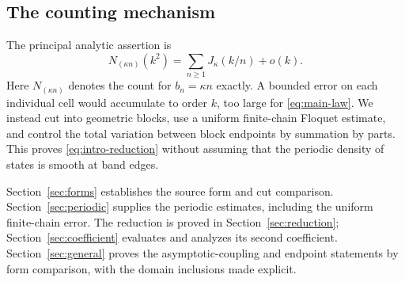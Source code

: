 \subsection{The counting mechanism}

The principal analytic assertion is
\begin{equation}
 N_{(\kappa n)}(k^2)=\sum_{n\ge1}J_\kappa(k/n)+o(k).
 \label{eq:intro-reduction}
\end{equation}
Here $N_{(\kappa n)}$ denotes the count for $b_n=\kappa n$ exactly.
A bounded error on each individual cell would accumulate to order
$k$, too large for \eqref{eq:main-law}. We instead cut into geometric
blocks, use a uniform finite-chain Floquet estimate, and control
the total variation between block endpoints by summation by parts.
This proves \eqref{eq:intro-reduction} without assuming that the
periodic density of states is smooth at band edges.

Section~\ref{sec:forms} establishes the source form and cut comparison.
Section~\ref{sec:periodic} supplies the periodic estimates, including
the uniform finite-chain error. The reduction is proved in
Section~\ref{sec:reduction}; Section~\ref{sec:coefficient} evaluates
and analyzes its second coefficient. Section~\ref{sec:general}
proves the asymptotic-coupling and endpoint statements by form
comparison, with the domain inclusions made explicit.
